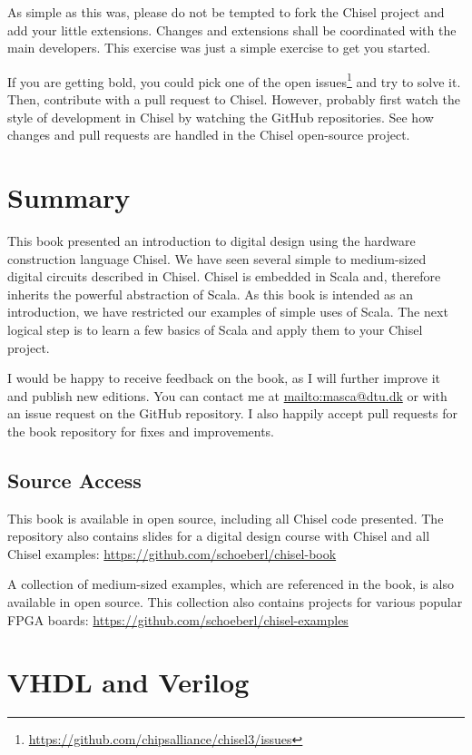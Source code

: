 \documentclass[%
    10pt,
    headinclude, footexclude,
    openright, %
    notitlepage,
    cleardoubleempty,
    headsepline,
    pointlessnumbers,
    bibtotoc, idxtotoc,
    ]{scrbook}
\newcommand{\myref}[2]{\href{#1}{#2}}
\renewcommand{\myref}[2]{{#2}{\footnote{\url{#1}}}}
\begin{document}
As simple as this was, please do not be tempted to fork the Chisel project and
add your little extensions. Changes and extensions shall be coordinated with the
main developers.
This exercise was just a simple exercise to get you started.

If you are getting bold, you could pick one of the
\myref{https://github.com/chipsalliance/chisel3/issues}{open issues} and try to solve it.
Then, contribute with a pull request to Chisel.
However, probably first watch the style of development in Chisel by watching the GitHub
repositories.
See how changes and pull requests are handled in the Chisel open-source project.


\chapter{Summary}
\label{sec:conclusion}

This book presented an introduction to digital design using the
hardware construction language Chisel.
We have seen several simple to medium-sized digital circuits
described in Chisel.
Chisel is embedded in Scala and, therefore inherits the powerful
abstraction of Scala.
As this book is intended as an introduction, we have restricted
our examples of simple uses of Scala.
The next logical step is to learn a few basics of Scala and apply them
to your Chisel project.

I would be happy to receive feedback on the book, as I will further
improve it and publish new editions. You can contact me at
\url{mailto:masca@dtu.dk} or with an issue request on the GitHub
repository. I also happily accept pull requests
for the book repository for fixes and improvements.

\section*{Source Access}

This book is available in open source, including all Chisel code presented.
The repository also contains slides for a digital design course with Chisel and
all Chisel examples: \url{https://github.com/schoeberl/chisel-book}

A collection of medium-sized examples, which are referenced
in the book, is also available in open source. This collection
also contains projects for various popular FPGA boards:
\url{https://github.com/schoeberl/chisel-examples}

\appendix

\chapter{VHDL and Verilog}
\end{document}
